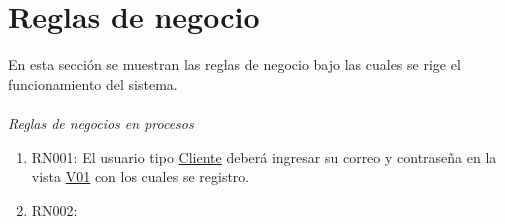 \chapter{Reglas de negocio}
	En esta secci\'on se muestran las reglas de negocio bajo las cuales se rige el funcionamiento del sistema.\\
	\\
	\textit{\large Reglas de negocios en procesos}
	\begin{enumerate}
		\item RN001: El usuario tipo \hyperlink{Cliente}{Cliente} deber\'a ingresar su correo y contrase\~na en la vista \hyperlink{V01}{V01} con los cuales se registro.
		\item RN002:
	\end{enumerate}